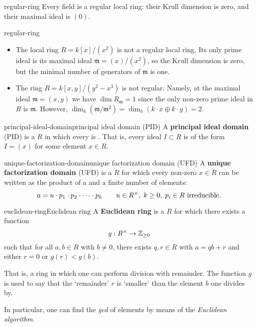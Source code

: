 \begin{example}{regular-ring}
    Every field is a regular local ring: their Krull dimension is zero, and their maximal ideal is $(0)$.
\end{example}

\begin{example}{regular-ring}
    \begin{itemize}
        \item The local ring $R = k[x]/(x^2)$ is not a regular local ring. Its only prime ideal is its maximal ideal $\mathfrak{m} = (x)/(x^2)$, so the Krull dimension is zero, but the minimal number of generators of $\mathfrak{m}$ is one.
        \item The ring $R = k[x, y]/(y^2 - x^3)$ is not regular. Namely, at the maximal ideal $\mathfrak{m} = (x, y)$ we have $\dim R_\mathfrak{m} = 1$ since the only non-zero prime ideal in $R$ is $\mathfrak{m}$. However, $\dim_k(\mathfrak{m} / \mathfrak{m}^2) = \dim_k(k \cdot x \oplus k \cdot y) = 2$.
    \end{itemize}
\end{example}

\begin{topic}{principal-ideal-domain}{principal ideal domain (PID)}
    A \textbf{principal ideal domain} (PID) is a  $R$ in which every  is . That is, every ideal $I \subset R$ is of the form $I = (x)$ for some element $x \in R$.
\end{topic}

\begin{topic}{unique-factorization-domain}{unique factorization domain (UFD)}
    A \textbf{unique factorization domain} (UFD) is a  $R$ for which every non-zero $x \in R$ can be written as the product of a  and a finite number of  elements:
    \[ a = u \cdot p_1 \cdot p_2 \cdot \cdots \cdot p_k \qquad u \in R^\times, \; k \ge 0, \; p_i \in R \textup{ irreducible}. \]
\end{topic}

\begin{topic}{euclidean-ring}{Euclidean ring}
    A \textbf{Euclidean ring} is a  $R$ for which there exists a function
    \[ g : R^\times \to \mathbb{Z}_{\ge 0} \]
    such that for all $a, b \in R$ with $b \ne 0$, there exists $q, r \in R$ with $a = qb + r$ and either $r = 0$ or $g(r) < g(b)$.
    
    That is, a ring in which one can perform division with remainder. The function $g$ is used to say that the `remainder' $r$ is `smaller' than the element $b$ one divides by.
    
    In particular, one can find the \textit{gcd} of elements by means of the \textit{Euclidean algorithm}.
\end{topic}

